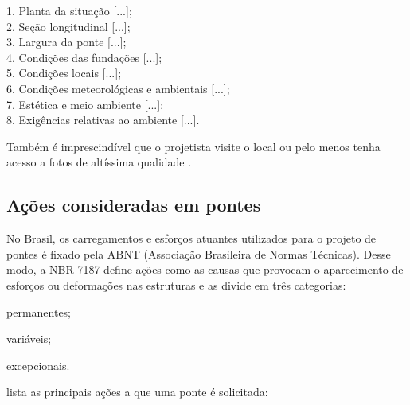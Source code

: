 \begin{citacao}
1. Planta da situação [...];\\
2. Seção longitudinal [...];\\
3. Largura da ponte [...];\\
4. Condições das fundações [...];\\
5. Condições locais [...];\\
6. Condições meteorológicas e ambientais [...];\\
7. Estética e meio ambiente [...];\\
8. Exigências relativas ao ambiente [...].
\end{citacao}

Também é imprescindível que o projetista visite o local ou pelo menos tenha acesso a fotos de
altíssima qualidade \cite[p.~19]{Leonhardt}.

\subsection{Ações consideradas em pontes}


No Brasil, os carregamentos e esforços atuantes utilizados para o projeto de pontes é fixado pela
ABNT (Associação Brasileira de Normas Técnicas). Desse modo, a NBR 7187 \cite[p.~3]{NBR7187:2013} define ações como as causas que provocam o aparecimento de esforços ou deformações nas estruturas e
as divide em três categorias:

\begin{alineas}
  \item  permanentes;
  \item  variáveis;
  \item  excepcionais.
\end{alineas}

 lista as principais ações a que uma ponte é solicitada:

